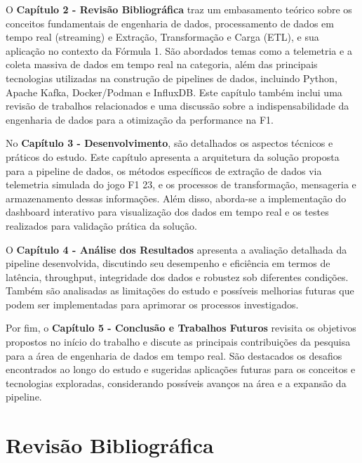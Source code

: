 \documentclass[12pt, %
openright, 
oneside, %
a4paper,    %
brazil]{facom-ufu-abntex2}
\begin{document}
O \textbf{Capítulo 2 - Revisão Bibliográfica} traz um embasamento teórico sobre os 
conceitos fundamentais de engenharia de dados, processamento de dados em tempo real 
(streaming) e Extração, Transformação e Carga (ETL), e sua aplicação no contexto da 
Fórmula 1. São abordados temas como a telemetria e a coleta massiva de dados em tempo 
real na categoria, além das principais tecnologias utilizadas na construção de 
pipelines de dados, incluindo Python, Apache Kafka, Docker/Podman e InfluxDB. Este 
capítulo também inclui uma revisão de trabalhos relacionados e uma discussão sobre a 
indispensabilidade da engenharia de dados para a otimização da performance na F1.

No \textbf{Capítulo 3 - Desenvolvimento}, são detalhados os aspectos técnicos e práticos 
do estudo. Este capítulo apresenta a arquitetura da solução proposta para a pipeline de 
dados, os métodos específicos de extração de dados via telemetria simulada do jogo F1 23, 
e os processos de transformação, mensageria e armazenamento dessas informações. Além 
disso, aborda-se a implementação do dashboard interativo para visualização dos dados em 
tempo real e os testes realizados para validação prática da solução.

O \textbf{Capítulo 4 - Análise dos Resultados} apresenta a avaliação detalhada da 
pipeline desenvolvida, discutindo seu desempenho e eficiência em termos de latência, 
throughput, integridade dos dados e robustez sob diferentes condições. Também são 
analisadas as limitações do estudo e possíveis melhorias futuras que podem ser 
implementadas para aprimorar os processos investigados.

Por fim, o \textbf{Capítulo 5 - Conclusão e Trabalhos Futuros} revisita os objetivos 
propostos no início do trabalho e discute as principais contribuições da pesquisa para a 
área de engenharia de dados em tempo real. São destacados os desafios encontrados ao 
longo do estudo e sugeridas aplicações futuras para os conceitos e tecnologias exploradas, 
considerando possíveis avanços na área e a expansão da pipeline.


\chapter{Revisão Bibliográfica}
\end{document}
